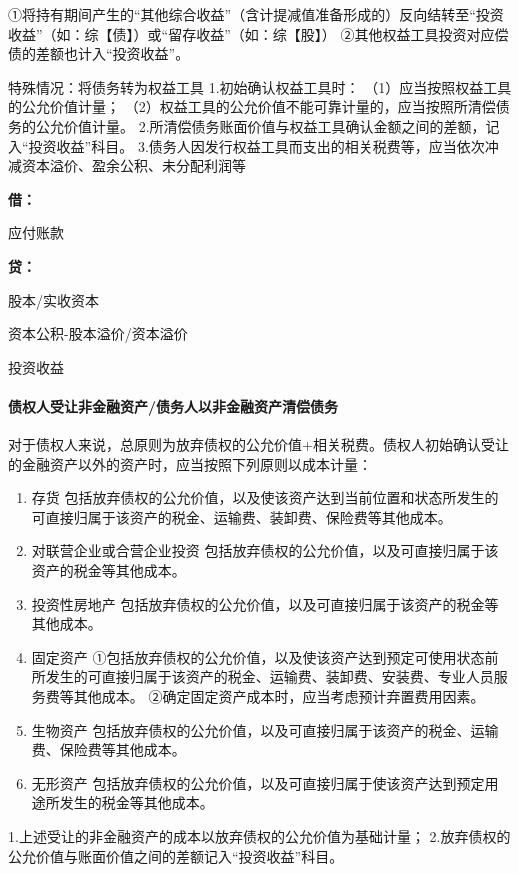 \documentclass[UTF8,12pt]{ctexart}
\newenvironment{Dr}{%
	\begin{list}{}%
		{
			\setlength{\leftmargin}{2em}
			\setlength{\labelwidth}{2em}
			\setlength{\labelsep}{0pt}
			\setlength{\itemindent}{0pt}
			\setlength{\listparindent}{0pt}
			\setlength{\parsep}{0pt}
			\setlength{\topsep}{0pt}
		}
		\item[\textbf{借：}]
	}{%
	\end{list}
}
\newenvironment{Cr}{%
	\begin{list}{}%
		{
			\setlength{\leftmargin}{2em}
			\setlength{\labelwidth}{2em}
			\setlength{\labelsep}{0pt}
			\setlength{\itemindent}{0pt}
			\setlength{\listparindent}{0pt}
			\setlength{\parsep}{0pt}
			\setlength{\topsep}{0pt}
		}
		\item[\textbf{贷：}]
	}{%
	\end{list}
}
\numberwithin{equation}{section} %
\numberwithin{figure}{section}
\numberwithin{table}{section}
\begin{document}
	①将持有期间产生的“其他综合收益”（含计提减值准备形成的）反向结转至“投资收益”（如：综【债】）或“留存收益”（如：综【股】）
	②其他权益工具投资对应偿债的差额也计入“投资收益”。
	
	特殊情况：将债务转为权益工具
	1.初始确认权益工具时：
	（1）应当按照权益工具的公允价值计量；
	（2）权益工具的公允价值不能可靠计量的，应当按照所清偿债务的公允价值计量。
	2.所清偿债务账面价值与权益工具确认金额之间的差额，记入“投资收益”科目。
	3.债务人因发行权益工具而支出的相关税费等，应当依次冲减资本溢价、盈余公积、未分配利润等
	\begin{Dr}
		应付账款
	\end{Dr}
	\begin{Cr}
		股本/实收资本
		
		资本公积-股本溢价/资本溢价
		
		投资收益
	\end{Cr}
	
	\paragraph{债权人受让非金融资产/债务人以非金融资产清偿债务}
	对于债权人来说，总原则为放弃债权的公允价值+相关税费。债权人初始确认受让的金融资产以外的资产时，应当按照下列原则以成本计量：
	\begin{enumerate}
		\item 存货	包括放弃债权的公允价值，以及使该资产达到当前位置和状态所发生的可直接归属于该资产的税金、运输费、装卸费、保险费等其他成本。
		
		\item 对联营企业或合营企业投资	包括放弃债权的公允价值，以及可直接归属于该资产的税金等其他成本。
		
		\item 投资性房地产	包括放弃债权的公允价值，以及可直接归属于该资产的税金等其他成本。
		
		\item 固定资产	①包括放弃债权的公允价值，以及使该资产达到预定可使用状态前所发生的可直接归属于该资产的税金、运输费、装卸费、安装费、专业人员服务费等其他成本。
		②确定固定资产成本时，应当考虑预计弃置费用因素。
		
		\item 生物资产	包括放弃债权的公允价值，以及可直接归属于该资产的税金、运输费、保险费等其他成本。
		
		\item 无形资产	包括放弃债权的公允价值，以及可直接归属于使该资产达到预定用途所发生的税金等其他成本。
		
	\end{enumerate}
	1.上述受让的非金融资产的成本以放弃债权的公允价值为基础计量；
	2.放弃债权的公允价值与账面价值之间的差额记入“投资收益”科目。
	
\end{document}
